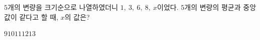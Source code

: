 $5$개의 변량을 크기순으로 나열하였더니 $1,\ 3,\ 6,\ 8,\ x$이었다. $5$개의 변량의 평균과 중앙값이 같다고 할 때, $x$의 값은?
\begin{choices32}{$9$}{$10$}{$11$}{$12$}{$13$}\end{choices32}
